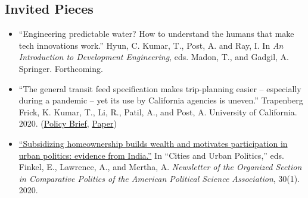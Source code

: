 \documentclass[11pt]{article}
\begin{document}
\subsection*{Invited Pieces}
\begin{itemize}
	\item[]``Engineering predictable water? How to understand the humans that make tech innovations
work.''  Hyun, C. Kumar, T., Post, A. and Ray, I.  In \textit{An Introduction to Development Engineering}, eds. Madon, T., and Gadgil, A. Springer. Forthcoming.
\item[]``The general transit feed specification makes trip-planning easier -- especially during a pandemic -- yet its use by California agencies is uneven.'' Trapenberg Frick, K. Kumar, T., Li, R., Patil, A., and Post, A.  University of California. 2020. (\href{https://escholarship.org/uc/item/9j94q60f}{Policy Brief}, \href{https://escholarship.org/uc/item/1f29b7dk}{Paper}) 
\item[] \href{https://www.comparativepoliticsnewsletter.org/wp-content/uploads/2020/05/Spring-Newsletter-2020.pdf}{``Subsidizing homeownership builds wealth and motivates participation in urban politics: evidence from India.''}  In ``Cities and Urban Politics,'' eds. Finkel, E.,  Lawrence, A.,  and Mertha, A.  \textit{Newsletter of the Organized Section in Comparative Politics of the American Political Science Association}, 30(1). 2020.
	\end{itemize}
	
\end{document}
